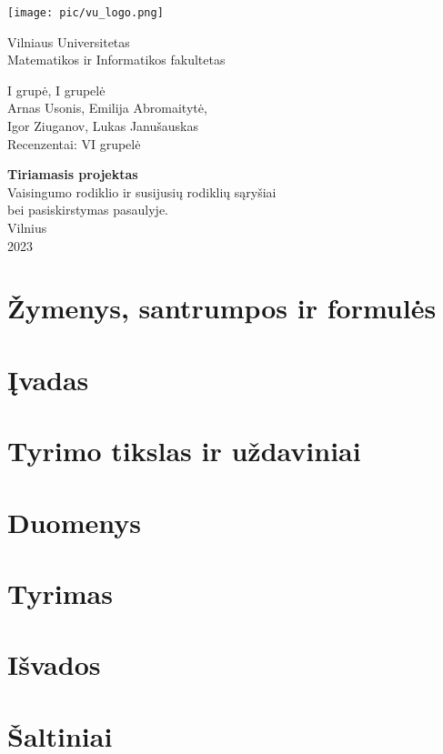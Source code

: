 \documentclass[12pt]{article}
\begin{document}
\begin{titlepage}
    \centering
    \texttt{[image: pic/vu\_logo.png]} \\
    {\Huge
    Vilniaus Universitetas \\
    Matematikos ir Informatikos fakultetas\par} 
    \vspace{2cm}
    
    \Large
    {I grupė, I grupelė \\
    Arnas Usonis, Emilija Abromaitytė, \\ Igor Ziuganov, Lukas Janušauskas \\
    Recenzentai: VI grupelė\par}
    \vspace{1cm}
    {\LARGE
    \textbf{Tiriamasis projektas \\}}
    \vspace{0.2cm}
    {\Large
    Vaisingumo rodiklio ir susijusių rodiklių sąryšiai \\ bei pasiskirstymas pasaulyje. \\}
    \vspace*{\fill}
    Vilnius \\ 2023
    
    
\end{titlepage}
\pagebreak

\normalsize
\tableofcontents
\pagebreak

\section{Žymenys, santrumpos ir formulės}

\pagebreak

\section{Įvadas}

\pagebreak

\section{Tyrimo tikslas ir uždaviniai}

\pagebreak

\section{Duomenys}

\pagebreak

\section{Tyrimas}

\pagebreak

\section{Išvados}

\pagebreak

\section{Šaltiniai}

\end{document}
